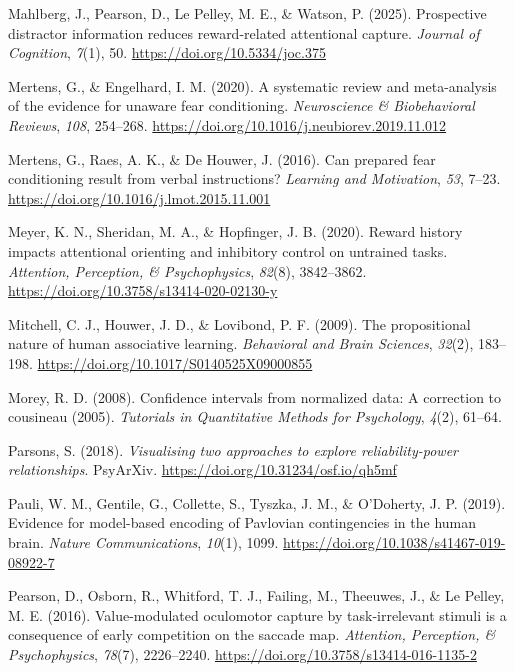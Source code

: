 \documentclass[
  man,
  floatsintext,
  longtable,
  nolmodern,
  notxfonts,
  notimes,
  colorlinks=true,linkcolor=blue,citecolor=blue,urlcolor=blue]{apa7}
\newlength{\cslhangindent}
\newenvironment{CSLReferences}[2] %
 {\begin{list}{}{%
  \setlength{\itemindent}{0pt}
  \setlength{\leftmargin}{0pt}
  \setlength{\parsep}{0pt}
  \ifodd #1
   \setlength{\leftmargin}{\cslhangindent}
   \setlength{\itemindent}{-1\cslhangindent}
  \fi
  \setlength{\itemsep}{#2\baselineskip}}}
 {\end{list}}
\begin{document}
\begin{CSLReferences}{1}{0}
Mahlberg, J., Pearson, D., Le Pelley, M. E., \& Watson, P. (2025).
Prospective distractor information reduces reward-related attentional
capture. \emph{Journal of Cognition}, \emph{7}(1), 50.
\url{https://doi.org/10.5334/joc.375}

Mertens, G., \& Engelhard, I. M. (2020). A systematic review and
meta-analysis of the evidence for unaware fear conditioning.
\emph{Neuroscience \& Biobehavioral Reviews}, \emph{108}, 254--268.
\url{https://doi.org/10.1016/j.neubiorev.2019.11.012}

Mertens, G., Raes, A. K., \& De Houwer, J. (2016). Can prepared fear
conditioning result from verbal instructions? \emph{Learning and
Motivation}, \emph{53}, 7--23.
\url{https://doi.org/10.1016/j.lmot.2015.11.001}

Meyer, K. N., Sheridan, M. A., \& Hopfinger, J. B. (2020). Reward
history impacts attentional orienting and inhibitory control on
untrained tasks. \emph{Attention, Perception, \& Psychophysics},
\emph{82}(8), 3842--3862.
\url{https://doi.org/10.3758/s13414-020-02130-y}

Mitchell, C. J., Houwer, J. D., \& Lovibond, P. F. (2009). The
propositional nature of human associative learning. \emph{Behavioral and
Brain Sciences}, \emph{32}(2), 183--198.
\url{https://doi.org/10.1017/S0140525X09000855}

Morey, R. D. (2008). Confidence intervals from normalized data: A
correction to cousineau (2005). \emph{Tutorials in Quantitative Methods
for Psychology}, \emph{4}(2), 61--64.

Parsons, S. (2018). \emph{Visualising two approaches to explore
reliability-power relationships}. PsyArXiv.
\url{https://doi.org/10.31234/osf.io/qh5mf}

Pauli, W. M., Gentile, G., Collette, S., Tyszka, J. M., \& O'Doherty, J.
P. (2019). Evidence for model-based encoding of Pavlovian contingencies
in the human brain. \emph{Nature Communications}, \emph{10}(1), 1099.
\url{https://doi.org/10.1038/s41467-019-08922-7}

Pearson, D., Osborn, R., Whitford, T. J., Failing, M., Theeuwes, J., \&
Le Pelley, M. E. (2016). Value-modulated oculomotor capture by
task-irrelevant stimuli is a consequence of early competition on the
saccade map. \emph{Attention, Perception, \& Psychophysics},
\emph{78}(7), 2226--2240.
\url{https://doi.org/10.3758/s13414-016-1135-2}


\end{CSLReferences}
\end{document}
